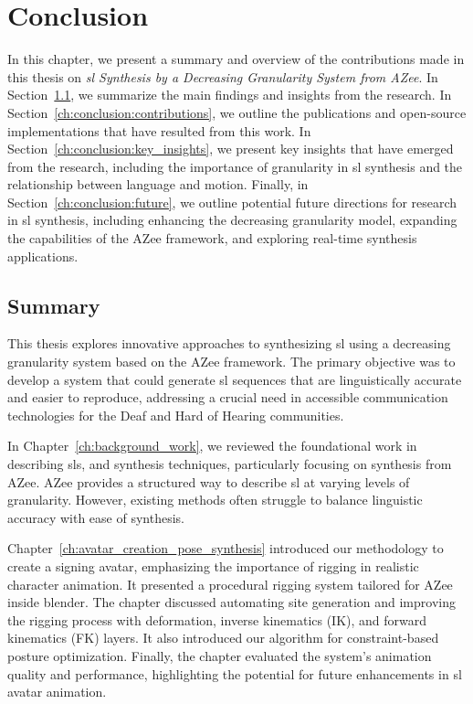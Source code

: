 \documentclass[../../main.tex]{subfiles}
\begin{document}
\chapter{Conclusion}
\label{ch:conclusion}

In this chapter, we present a summary and overview of the contributions made in this thesis on \textit{\gls{sl} Synthesis by a Decreasing Granularity System from AZee}. In Section~\ref{ch:conclusion:summary}, we summarize the main findings and insights from the research. In Section~\ref{ch:conclusion:contributions}, we outline the publications and open-source implementations that have resulted from this work. In Section~\ref{ch:conclusion:key_insights}, we present key insights that have emerged from the research, including the importance of granularity in \gls{sl} synthesis and the relationship between language and motion. Finally, in Section~\ref{ch:conclusion:future}, we outline potential future directions for research in \gls{sl} synthesis, including enhancing the decreasing granularity model, expanding the capabilities of the AZee framework, and exploring real-time synthesis applications.

\section{Summary}
\label{ch:conclusion:summary}

This thesis explores innovative approaches to synthesizing \gls{sl} using a decreasing granularity system based on the AZee framework. The primary objective was to develop a system that could generate \gls{sl} sequences that are linguistically accurate and easier to reproduce, addressing a crucial need in accessible communication technologies for the Deaf and Hard of Hearing communities.

In Chapter~\ref{ch:background_work}, we reviewed the foundational work in describing \gls{sl}s, and synthesis techniques, particularly focusing on synthesis from AZee. AZee provides a structured way to describe \gls{sl} at varying levels of granularity. However, existing methods often struggle to balance linguistic accuracy with ease of synthesis. 

Chapter~\ref{ch:avatar_creation_pose_synthesis} introduced our methodology to create a signing avatar, emphasizing the importance of rigging in realistic character animation. It presented a procedural rigging system tailored for AZee inside blender. The chapter discussed automating site generation and improving the rigging process with deformation, inverse kinematics (IK), and forward kinematics (FK) layers. It also introduced our algorithm for constraint-based posture optimization. Finally, the chapter evaluated the system’s animation quality and performance, highlighting the potential for future enhancements in \gls{sl} avatar animation. 
\end{document}
